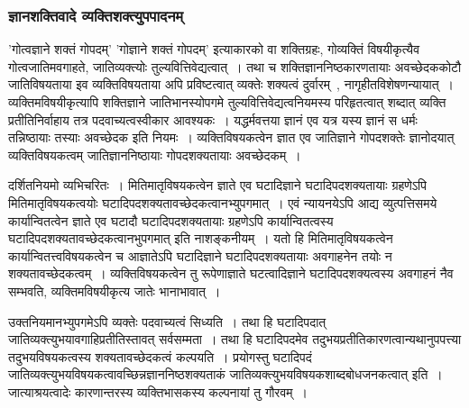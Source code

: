 			\subsubsection{ज्ञानशक्तिवादे व्यक्तिशक्त्युपपादनम्}

				'गोत्वज्ञाने शक्तं गोपदम्' 'गोज्ञाने शक्तं गोपदम्' इत्याकारको वा शक्तिग्रहः, गोव्यक्तिं विषयीकृत्यैव गोत्वजातिमवगाहते, जातिव्यक्त्योः तुल्यवित्तिवेद्यत्वात्~। तथा च शक्तिज्ञाननिष्ठकारणतायाः अवच्छेदककोटौ जातिविषयताया इव व्यक्तिविषयताया अपि प्रविष्टत्वात् व्यक्तेः शक्यत्वं दुर्वारम्~, नागृहीतविशेषणन्यायात्~। व्यक्तिमविषयीकृत्यापि शक्तिज्ञाने जातिभानस्योपगमे तुल्यवित्तिवेद्यत्वनियमस्य परिहृतत्वात् शब्दात् व्यक्ति प्रतीतिनिर्वाहाय तत्र पदवाच्यत्वस्वीकार आवश्यकः~। यद्धर्मवत्तया ज्ञानं एव यत्र यस्य ज्ञानं स धर्मः तन्निष्ठायाः तस्याः अवच्छेदक इति नियमः~। व्यक्तिविषयकत्वेन ज्ञात एव जातिज्ञाने गोपदशक्तेः ज्ञानोदयात् व्यक्तिविषयकत्वम् जातिज्ञाननिष्ठायाः गोपदशक्यतायाः अवच्छेदकम्~। 

				दर्शितनियमो व्यभिचरितः~। मितिमातृविषयकत्वेन ज्ञाते एव घटादिज्ञाने घटादिपदशक्यतायाः ग्रहणेऽपि मितिमातृविषयकत्वयोः घटादिपदशक्यतावच्छेदकत्वानभ्युपगमात्~। एवं न्यायनयेऽपि आद्य व्युत्पत्तिसमये कार्यान्वितत्वेन ज्ञाते एव घटादौ घटादिपदशक्यतायाः ग्रहणेऽपि कार्यान्वितत्वस्य घटादिपदशक्यतावच्छेदकत्वानभुपगमात् इति नाशङ्कनीयम्~। यतो हि मितिमातृविषयकत्वेन कार्यान्वितत्त्वविषयकत्वेन च आज्ञातेऽपि घटादिज्ञाने घटादिपदशक्यतायाः अवगाहनेन तयोः न शक्यतावच्छेदकत्वम्~।  व्यक्तिविषयकत्वेन तु रूपेणाज्ञाते घटत्वादिज्ञाने घटादिपदशक्यत्वस्य अवगाहनं नैव सम्भवति, व्यक्तिमविषयीकृत्य जातेः भानाभावात्~। 

				उक्तनियमानभ्युपगमेऽपि व्यक्तेः पदवाच्यत्वं सिध्यति~। तथा हि घटादिपदात् जातिव्यक्त्युभयावगाहिप्रतीतिस्तावत् सर्वसम्मता~। तथा हि घटादिपदमेव तदुभयप्रतीतिकारणत्वान्यथानुपपत्त्या तदुभयविषयकत्वस्य शक्यतावच्छेदकत्वं कल्पयति~। प्रयोगस्तु घटादिपदं जातिव्यक्त्युभयविषयकत्वावच्छिन्नज्ञाननिष्ठशक्यताकं जातिव्यक्त्युभयविषयकशाब्दबोधजनकत्वात् इति~। जात्याश्रयत्वादेः कारणान्तरस्य व्यक्तिभासकस्य कल्पनायां तु गौरवम्~। 

